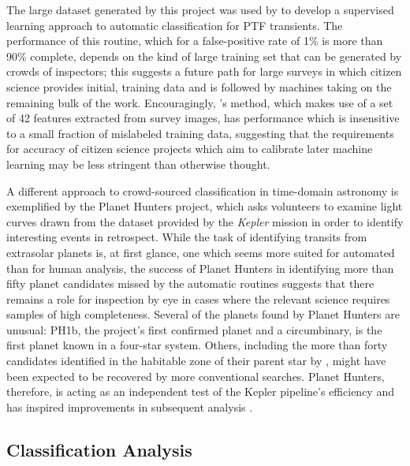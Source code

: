 \documentclass{ar2e}
\begin{document}
The large dataset generated by this project was used by \citet{Brink} to develop
a supervised learning approach to automatic classification for PTF transients.
The performance of this routine, which for a false-positive rate of 1\% is more
than 90\% complete, depends on the kind of large training set that can be
generated by crowds of inspectors; this suggests a future path for large surveys
in which citizen science provides initial, training data and is followed by
machines taking on the remaining bulk of the work. Encouragingly,
\citeauthor{Brink}'s method, which makes use of a set of 42 features extracted
from survey images, has performance which is insensitive to a small fraction of
mislabeled training data, suggesting that the requirements for accuracy of
citizen science projects which aim to calibrate later machine learning may be
less stringent than otherwise thought. 

A different approach to crowd-sourced classification in time-domain astronomy is
exemplified by the Planet Hunters project, which asks volunteers to examine
light curves drawn from the dataset provided by the \emph{Kepler} mission in
order to identify interesting events in retrospect. While the task of
identifying transits from extrasolar planets is, at first glance, one which
seems more suited for automated than for human analysis, the success of Planet
Hunters in identifying more than fifty planet candidates missed by the automatic
routines suggests that there remains a role for inspection by eye in cases where
the relevant science requires samples of high completeness. Several of the
planets found by Planet Hunters are unusual: PH1b, the project's first confirmed
planet \citep{Schwamb++2013} and a circumbinary, is the first planet known in a
four-star system. Others, including the more than forty candidates identified in
the habitable zone of their parent star by \citep{Wang++2013}, might have been
expected to be recovered by more conventional searches. Planet Hunters,
therefore, is acting as an independent test of the Kepler pipeline's efficiency
\citep{Schwamb++2012} and has inspired improvements in subsequent analysis
\citep{Batalha++2013}. 



\subsection{Classification Analysis}
\label{sec:class:analysis}
\end{document}
